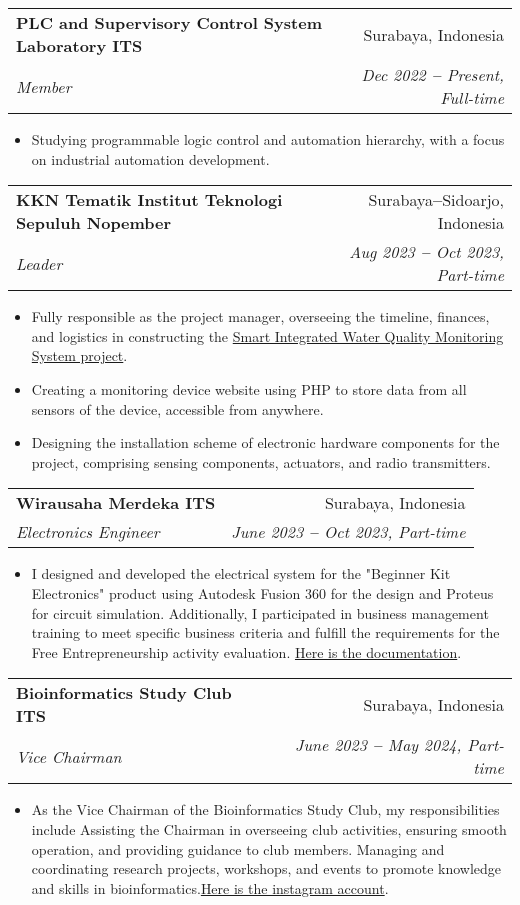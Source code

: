\documentclass[letterpaper,11pt]{article}
\makeatletter
\newcommand{\resumeItem}[1]{
  \item\small{
    {#1 \vspace{-2pt}}
  }
}
\newcommand{\resumeSubheading}[4]{
  \vspace{-2pt}\item
    \begin{tabular*}{0.97\textwidth}[t]{l@{\extracolsep{\fill}}r}
      \textbf{#1} & #2 \\
      \textit{\small#3} & \textit{\small #4} \\
    \end{tabular*}\vspace{-7pt}
}
\newcommand{\resumeItemListStart}{\begin{itemize}}
\newcommand{\resumeItemListEnd}{\end{itemize}\vspace{-5pt}}
\makeatother
\begin{document}
    \resumeSubheading
      {PLC and Supervisory Control System Laboratory ITS}{Surabaya, Indonesia}
      {Member}{Dec 2022 \textbf{--} Present, Full-time}
        \resumeItemListStart
            \resumeItem{Studying programmable logic control and automation hierarchy, with a focus on industrial automation development.}
        \resumeItemListEnd

    \vspace{2pt}
    \resumeSubheading
      {KKN Tematik Institut Teknologi Sepuluh Nopember}{Surabaya\textbf{--}Sidoarjo, Indonesia}
      {Leader}{Aug 2023 \textbf{--} Oct 2023, Part-time}
        \resumeItemListStart
            \resumeItem{Fully responsible as the project manager, overseeing the timeline, finances, and logistics in constructing the  \href{https://www.its.ac.id/news/2023/09/12/bantu-petambak-abmas-its-gagas-alat-pengontrol-kualitas-air/}{\color{blue}Smart Integrated Water Quality Monitoring System project}.}
            \resumeItem{Creating a monitoring device website using PHP to store data from all sensors of the device, accessible from anywhere.}
            \resumeItem{Designing the installation scheme of electronic hardware components for the project, comprising sensing components, actuators, and radio transmitters.}
        \resumeItemListEnd

         \resumeSubheading
      {Wirausaha Merdeka ITS}{Surabaya, Indonesia}
      {Electronics Engineer}{June 2023 \textbf{--} Oct 2023, Part-time}
        \resumeItemListStart
            \resumeItem{I designed and developed the electrical system for the "Beginner Kit Electronics" product using Autodesk Fusion 360 for the design and Proteus for circuit simulation. Additionally, I participated in business management training to meet specific business criteria and fulfill the requirements for the Free Entrepreneurship activity evaluation.  \href{https://www.youtube.com/watch?v=fzd8DhDGEHg}{\color{blue}Here is the documentation}.}
        \resumeItemListEnd


        \resumeSubheading
      {Bioinformatics Study Club ITS}{Surabaya, Indonesia}
      {Vice Chairman}{June 2023 \textbf{--} May 2024, Part-time}
        \resumeItemListStart
            \resumeItem{As the Vice Chairman of the Bioinformatics Study Club, my responsibilities include Assisting the Chairman in overseeing club activities, ensuring smooth operation, and providing guidance to club members. Managing and coordinating research projects, workshops, and events to promote knowledge and skills in bioinformatics.\href{https://www.instagram.com/bsc.its/?hl=id}{\color{blue}Here is the instagram account}.}
        \resumeItemListEnd
    
\end{document}
